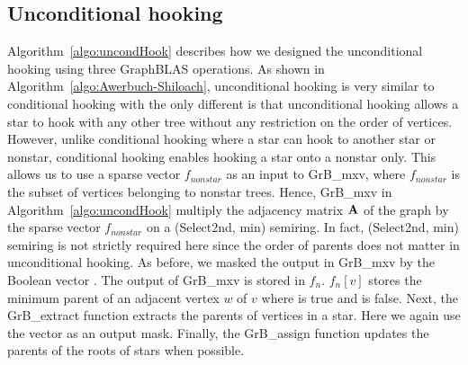 \subsection{Unconditional hooking}
Algorithm~\ref{algo:uncondHook} describes how we designed the unconditional hooking using three GraphBLAS operations.
As shown in Algorithm~\ref{algo:Awerbuch-Shiloach},  unconditional hooking is very similar to conditional hooking  with the only different is that unconditional hooking allows a star to hook with any other tree without any restriction on the order of vertices.
However, unlike conditional hooking where a star can hook to another star or nonstar, conditional hooking enables hooking a star onto a nonstar only. 
This allows us to use a sparse vector $f_{nonstar}$ as an input to GrB\_mxv, where $f_{nonstar}$ is the subset of vertices belonging to nonstar trees. 
Hence, GrB\_mxv in  Algorithm~\ref{algo:uncondHook} multiply the adjacency matrix $\mathbf{A}$ of the graph by the sparse vector $f_{nonstar}$ on a (Select2nd, min) semiring. 
In fact, (Select2nd, min) semiring is not strictly required here since the order of parents does not matter in unconditional hooking.
As before, we masked the output in GrB\_mxv by the Boolean vector .
The output of GrB\_mxv is stored in $f_n$.  $f_n[v]$ stores the minimum parent of an adjacent vertex $w$ of $v$ where  is true and  is false.  
Next, the GrB\_extract function extracts the parents of vertices in a star. Here we again use the  vector as an output mask.
Finally, the GrB\_assign function updates the parents of the roots of stars when possible.


